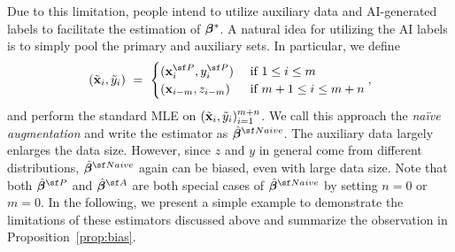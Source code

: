 Due to this limitation, people intend to utilize auxiliary data and AI-generated labels to facilitate the estimation of $\bm{\beta}^*$. A natural idea for utilizing the AI labels is to simply pool the primary and auxiliary sets. In particular, we define
$$
(\tilde{\x}_{i}, \tilde{y}_i)~=~
\begin{cases}
    ({\x}_{i}^{\sf P}, y_{i}^{\sf P})~&\text{if } 1 \leq i \leq m \\
    ({\x}_{i-m}, z_{i-m})~&\text{if } m+1 \leq i \leq m+n
\end{cases},
$$
and perform the standard MLE on $(\tilde{\mathbf{x}}_{i}, \tilde{y}_i)_{i=1}^{m+n}$.
We call this approach the \textit{na\"ive augmentation} and write the estimator as $\hat{\betavec}^{\sf Naive}$. The auxiliary data largely enlarges the data size. However, since $z$ and $y$ in general come from different distributions, $\hat{\betavec}^{\sf Naive}$ again can be biased, even with large data size. Note that both $\hat{\betavec}^{\sf P}$ and $\hat{\betavec}^{\sf A}$ are both special cases of $\hat{\betavec}^{\sf Naive}$ by setting $n = 0$ or $m = 0$. In the following, we present a simple example to demonstrate the limitations of these estimators discussed above and summarize the observation in Proposition~\ref{prop:bias}.

